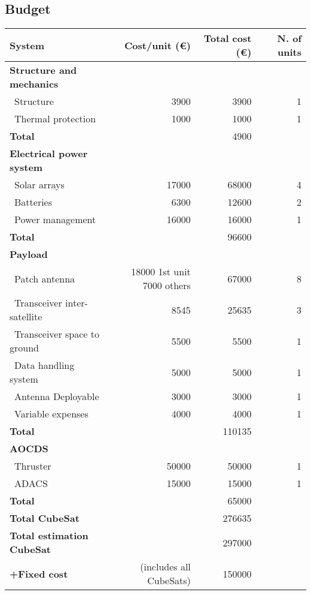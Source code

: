 \subsection{Budget}

\begin{longtable}{| l | r | r | r |}
\rowcolor[gray]{0.80}	\textbf{System} & \textbf{Cost/unit (\euro)} & \textbf{Total cost (\euro)} & \textbf{N. of units}\\
    \hline
    \endfirsthead


\rowcolor[gray]{0.85} \textbf{Structure and mechanics} & & & \\
   ~Structure & 3900 & 3900 & 1 \\
   ~Thermal protection & 1000  & 1000 & 1\\
   \hline
   \rowcolor[gray]{0.95} \textbf{Total} &  & 4900 &  \\
   \hline
   
\rowcolor[gray]{0.85} \textbf{Electrical power system} & & & \\
   ~Solar arrays & 17000 & 68000 & 4 \\
   ~Batteries & 6300 & 12600 & 2 \\
   ~Power management & 16000 & 16000 & 1 \\
   \hline
   \rowcolor[gray]{0.95} \textbf{Total} & & 96600 &  \\
   \hline

\rowcolor[gray]{0.85} \textbf{Payload} & & & \\

   ~Patch antenna & \makecell{18000 1st unit \\ 7000 others} & 67000 & 8 \\
   ~Transceiver inter-satellite & 8545 & 25635 & 3 \\
   ~Transceiver space to ground & 5500  & 5500 & 1 \\
   ~Data handling system & 5000 & 5000 & 1\\
   ~Antenna Deployable & 3000 & 3000 & 1\\
   ~Variable expenses & 4000 & 4000 & 1\\
   \hline
   \rowcolor[gray]{0.95} \textbf{Total} & & 110135 & \\
   \hline
   
\rowcolor[gray]{0.85} \textbf{AOCDS} & & &\\

   ~Thruster & 50000 & 50000 & 1 \\
   ~ADACS & 15000 & 15000 & 1 \\
   \hline
   \rowcolor[gray]{0.95} \textbf{Total} & & 65000 & \\
   \hline

\rowcolor[gray]{0.9} \textbf{Total CubeSat} & & 276635 & \\
\hline
\rowcolor[gray]{0.9} \textbf{Total estimation CubeSat} & & 297000 & \\
\hline
\rowcolor[gray]{0.9} \textbf{+Fixed cost} & (includes all CubeSats) & 150000 & \\
\hline

\end{longtable} 

